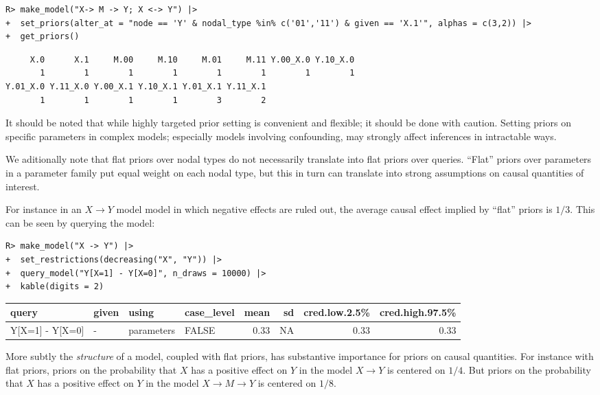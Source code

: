\documentclass[
  11pt,
  article]{jss}
\begin{document}
\begin{verbatim}
R> make_model("X-> M -> Y; X <-> Y") |>
+  set_priors(alter_at = "node == 'Y' & nodal_type %in% c('01','11') & given == 'X.1'", alphas = c(3,2)) |>
+  get_priors()
\end{verbatim}

\begin{verbatim}
     X.0      X.1     M.00     M.10     M.01     M.11 Y.00_X.0 Y.10_X.0 
       1        1        1        1        1        1        1        1 
Y.01_X.0 Y.11_X.0 Y.00_X.1 Y.10_X.1 Y.01_X.1 Y.11_X.1 
       1        1        1        1        3        2 
\end{verbatim}

It should be noted that while highly targeted prior setting is
convenient and flexible; it should be done with caution. Setting priors
on specific parameters in complex models; especially models involving
confounding, may strongly affect inferences in intractable ways.

We aditionally note that flat priors over nodal types do not necessarily
translate into flat priors over queries. ``Flat'' priors over parameters
in a parameter family put equal weight on each nodal type, but this in
turn can translate into strong assumptions on causal quantities of
interest.

For instance in an \(X \rightarrow Y\) model model in which negative
effects are ruled out, the average causal effect implied by ``flat''
priors is \(1/3\). This can be seen by querying the model:

\begin{verbatim}
R> make_model("X -> Y") |>
+  set_restrictions(decreasing("X", "Y")) |>
+  query_model("Y[X=1] - Y[X=0]", n_draws = 10000) |>
+  kable(digits = 2)
\end{verbatim}

\begin{tabular}{l|l|l|l|r|r|r|r}
\hline
query & given & using & case\_level & mean & sd & cred.low.2.5\% & cred.high.97.5\%\\
\hline
Y[X=1] - Y[X=0] & - & parameters & FALSE & 0.33 & NA & 0.33 & 0.33\\
\hline
\end{tabular}

More subtly the \emph{structure} of a model, coupled with flat priors,
has substantive importance for priors on causal quantities. For instance
with flat priors, priors on the probability that \(X\) has a positive
effect on \(Y\) in the model \(X \rightarrow Y\) is centered on \(1/4\).
But priors on the probability that \(X\) has a positive effect on \(Y\)
in the model \(X \rightarrow M \rightarrow Y\) is centered on \(1/8\).
\end{document}
